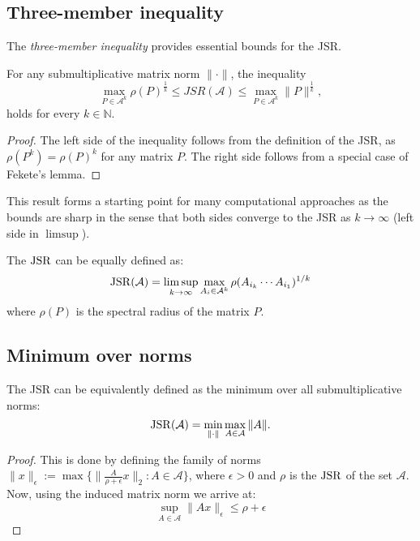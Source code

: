 \subsection*{Three-member inequality}
The \emph{three-member inequality} provides essential bounds for the JSR. 

\begin{proposition}
    For any submultiplicative matrix norm $\|\cdot\|$, the inequality
    \begin{equation}
    \max_{P \in \mathcal{A}^k} \rho(P)^{\frac{1}{k}} \leq JSR(\mathcal{A}) \leq \max_{P \in \mathcal{A}^k} \| P\|^{\frac{1}{k}},
    \label{eq:three-member}
    \end{equation}
    holds for every $k \in \mathbb{N}$.
\end{proposition}
\begin{proof}
    The left side of the inequality follows from the definition of the JSR, as $\rho(P^k) = \rho(P)^k$ for any matrix $P$. The right side follows from a special case of Fekete's lemma.
\end{proof}
This result forms a starting point for many computational approaches as the bounds are sharp in the sense that both sides converge to the JSR as $k\rightarrow \infty$ (left side in $\limsup$).

\begin{proposition}
    The $\operatorname{JSR}$ can be equally defined as:
    $$
    \operatorname{JSR}(\mathcal{A}) = \limsup_{k \to \infty} \max_{A_i \in \mathcal{A}^k} \rho(A_{i_k} \cdots A_{i_1})^{1/k}
    $$
    where $\rho(P)$ is the spectral radius of the matrix $P$.
\end{proposition}

\subsection*{Minimum over norms}
\begin{proposition}
    The JSR can be equivalently defined as the minimum over all submultiplicative norms:
    \begin{equation}
        \operatorname{JSR}(\mathcal{A}) = \min_{\|\cdot\|} \max_{A \in \mathcal{A}} \|A\|.
    \end{equation}
\end{proposition}

\begin{proof}
    This is done by defining the family of norms $\|x\|_{\epsilon} := \max \{ \| \frac{A}{\rho + \epsilon}x\|_2 : A \in \mathcal{A}\}$,
    where $\epsilon > 0$ and $\rho$ is the $\operatorname{JSR}$ of the set $\mathcal{A}$.
    Now, using the induced matrix norm we arrive at: 
    $$ \sup _{A \in \mathcal{A}} \|Ax\|_{\epsilon} \leq \rho + \epsilon$$

\end{proof}

